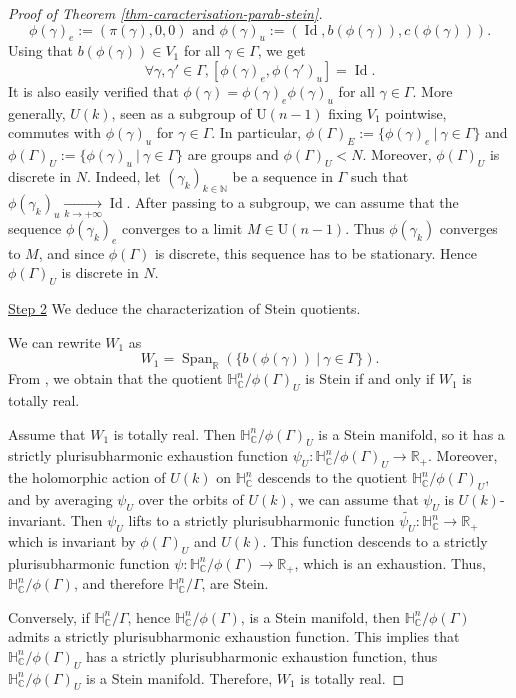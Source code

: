 \documentclass{article}
\theoremstyle{definition}
\theoremstyle{remark}
\newcommand{\C}{\mathbb{C}}
\newcommand{\R}{\mathbb{R}}
\newcommand{\N}{\mathbb{N}}
\newcommand{\HNC}{\mathbb{H}^{n}_{\C}}
\DeclareMathOperator{\Id}{\text{Id}}
\begin{document}
\begin{proof}[Proof of Theorem \ref{thm-caracterisation-parab-stein}]
		\begin{equation*}
			\phi(\gamma)_e := (\pi(\gamma),0,0) \text{ and }
			\phi(\gamma)_u := (\Id,b(\phi(\gamma)),c(\phi(\gamma))).
		\end{equation*}
		Using that $b(\phi(\gamma))\in V_1$ for all $\gamma\in \Gamma$, we get
		\begin{equation*}
			\forall \gamma,\gamma'\in \Gamma, [\phi(\gamma)_e,\phi(\gamma')_u] = \Id.
		\end{equation*}It is also easily verified that $\phi(\gamma) = \phi(\gamma)_e\phi(\gamma)_u$ for all $\gamma \in \Gamma$. 
		More generally, $U(k)$, seen as a subgroup of $\mathrm{U}(n-1)$ fixing $V_1$ pointwise, commutes with $\phi(\gamma)_u$ for $\gamma\in \Gamma$. In particular, $\phi(\Gamma)_E:= \{\phi(\gamma)_e \ \vert \ \gamma \in \Gamma\}$ and $\phi(\Gamma)_U := \{\phi(\gamma)_u \ \vert \ \gamma \in \Gamma\}$ are groups and $\phi(\Gamma)_U<N$. Moreover, $\phi(\Gamma)_U$ is discrete in $N$. Indeed, let $(\gamma_k)_{k\in \N}$ be a sequence in $\Gamma$ such that $\phi(\gamma_k)_u \underset{k\to +\infty}{\longrightarrow} \Id$. After passing to a subgroup, we can assume that the sequence $\phi(\gamma_k)_e$ converges to a limit $M\in \mathrm{U}(n-1)$. Thus $\phi(\gamma_k)$ converges to $M$, and since $\phi(\Gamma)$ is discrete, this sequence has to be stationary. Hence $\phi(\Gamma)_U$ is discrete in $N$.
		
		\underline{Step 2} We deduce the characterization of Stein quotients.
		
		We can rewrite $W_1$ as
		\begin{equation*}
			W_1 = \operatorname{Span}_{\R}(\{b(\phi(\gamma)) \ \vert \ \gamma \in \Gamma\}).
		\end{equation*}
		From \cite[Theorem 1.4]{miebachQuotientsBoundedHomogeneous2024}, we obtain that the quotient $\HNC/\phi(\Gamma)_U$ is Stein if and only if $W_1$ is totally real.
		
		Assume that $W_1$ is totally real. Then $\HNC/\phi(\Gamma)_U$ is a Stein manifold, so it has a strictly plurisubharmonic exhaustion function $\psi_U:\HNC/\phi(\Gamma)_U\to \R_+$. Moreover, the holomorphic action of $U(k)$ on $\HNC$ descends to the quotient $\HNC/\phi(\Gamma)_U$, and by averaging $\psi_U$ over the orbits of $U(k)$, we can assume that $\psi_U$ is $U(k)$-invariant. Then $\psi_U$ lifts to a strictly plurisubharmonic function $\widetilde{\psi_U}:\HNC\to \R_+$ which is invariant by $\phi(\Gamma)_U$ and $U(k)$. This function descends to a strictly plurisubharmonic function $\psi:\HNC/\phi(\Gamma)\to \R_+$, which is an exhaustion. Thus, $\HNC/\phi(\Gamma)$, and therefore $\HNC/\Gamma$, are Stein.
		
		Conversely, if $\HNC/\Gamma$, hence $\HNC/\phi(\Gamma)$, is a Stein manifold, then $\HNC/\phi(\Gamma)$ admits a strictly plurisubharmonic exhaustion function. This implies that $\HNC/\phi(\Gamma)_U$ has a strictly plurisubharmonic exhaustion function, thus $\HNC/\phi(\Gamma)_U$ is a Stein manifold. Therefore, $W_1$ is totally real.
	\end{proof}
	
\end{document}
